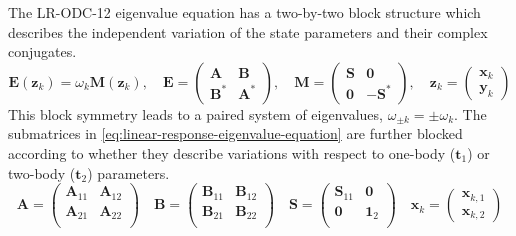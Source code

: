 The LR-ODC-12 eigenvalue equation has a two-by-two block structure which
describes the independent variation of the state parameters and their complex
conjugates.
\begin{equation}
    \label{eq:linear-response-eigenvalue-equation}
    \mathbf{E}(\mathbf{z}_k)
    =
    \omega_k
    \mathbf{M}(\mathbf{z}_k)
    ,
    \quad
    \mathbf{E}
    =
    \begin{pmatrix}
        \mathbf{A} & \mathbf{B} \\
        \mathbf{B}^* & \mathbf{A}^*
    \end{pmatrix}
    ,
    \quad
    \mathbf{M}
    =
    \begin{pmatrix}
        \mathbf{S} & \mathbf{0} \\
        \mathbf{0} & -\mathbf{S}^*
    \end{pmatrix}
    ,
    \quad
    \mathbf{z}_k
    =
    \begin{pmatrix}
        \mathbf{x}_k \\
        \mathbf{y}_k
    \end{pmatrix}
\end{equation}
This block symmetry leads to a paired system of eigenvalues,
\(
    \omega_{\pm k}
    =
    \pm\omega_k
\).
The submatrices in \cref{eq:linear-response-eigenvalue-equation} are further
blocked according to whether they describe variations with respect to one-body
(\(\mathbf{t}_1\)) or two-body (\(\mathbf{t}_2\)) parameters.
\begin{equation}
    \mathbf{A}
    =
    \begin{pmatrix}
        \mathbf{A}_{11} & \mathbf{A}_{12} \\
        \mathbf{A}_{21} & \mathbf{A}_{22} \\
    \end{pmatrix}
    \quad
    \mathbf{B}
    =
    \begin{pmatrix}
        \mathbf{B}_{11} & \mathbf{B}_{12} \\
        \mathbf{B}_{21} & \mathbf{B}_{22} \\
    \end{pmatrix}
    \quad
    \mathbf{S}
    =
    \begin{pmatrix}
        \mathbf{S}_{11} & \mathbf{0} \\
        \mathbf{0} & \mathbf{1}_2 \\
    \end{pmatrix}
    \quad
    \mathbf{x}_k
    =
    \begin{pmatrix}
        \mathbf{x}_{k,1} \\
        \mathbf{x}_{k,2}
    \end{pmatrix}
\end{equation}
